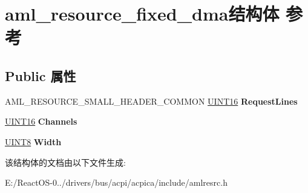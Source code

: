 \hypertarget{structaml__resource__fixed__dma}{}\section{aml\+\_\+resource\+\_\+fixed\+\_\+dma结构体 参考}
\label{structaml__resource__fixed__dma}
\subsection*{Public 属性}
\begin{DoxyCompactItemize}
\item 
\mbox{\label{structaml__resource__fixed__dma_a0998c498ffe27bf327478edbd1e62833}} 
A\+M\+L\+\_\+\+R\+E\+S\+O\+U\+R\+C\+E\+\_\+\+S\+M\+A\+L\+L\+\_\+\+H\+E\+A\+D\+E\+R\+\_\+\+C\+O\+M\+M\+ON \hyperlink{_processor_bind_8h_a09f1a1fb2293e33483cc8d44aefb1eb1}{U\+I\+N\+T16} {\bfseries Request\+Lines}
\item 
\mbox{\label{structaml__resource__fixed__dma_ab2a02e97c22621fc7cfe77d425bc9f2a}} 
\hyperlink{_processor_bind_8h_a09f1a1fb2293e33483cc8d44aefb1eb1}{U\+I\+N\+T16} {\bfseries Channels}
\item 
\mbox{\label{structaml__resource__fixed__dma_a8fe4fe868ac33ca242a0655152961e30}} 
\hyperlink{_processor_bind_8h_ab27e9918b538ce9d8ca692479b375b6a}{U\+I\+N\+T8} {\bfseries Width}
\end{DoxyCompactItemize}


该结构体的文档由以下文件生成\+:\begin{DoxyCompactItemize}
\item 
E\+:/\+React\+O\+S-\/0../drivers/bus/acpi/acpica/include/amlresrc.\+h\end{DoxyCompactItemize}

